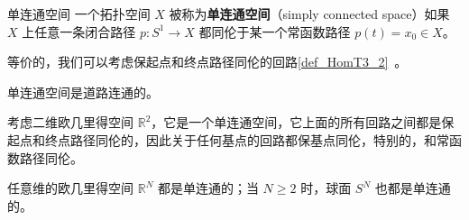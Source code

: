 

\begin{definition}{单连通空间}\label{def_SmpCn_1}
一个拓扑空间 $X$ 被称为\textbf{单连通空间}（simply connected space）如果 $X$ 上任意一条闭合路径 $p: S^1 \to X$ 都同伦于某一个常函数路径 $p(t) = x_0 \in X$。
\end{definition}

等价的，我们可以考虑保起点和终点路径同伦的回路\autoref{def_HomT3_2}~。

\begin{theorem}{}
单连通空间是道路连通的。
\end{theorem}

\begin{example}{}
考虑二维欧几里得空间 $\mathbb{R}^2$，它是一个单连通空间，它上面的所有回路之间都是保起点和终点路径同伦的，因此关于任何基点的回路都保基点同伦，特别的，和常函数路径同伦。

任意维的欧几里得空间 $\mathbb{R}^N$ 都是单连通的；当 $N \geq 2$ 时，球面 $S^N$ 也都是单连通的。
\end{example}
